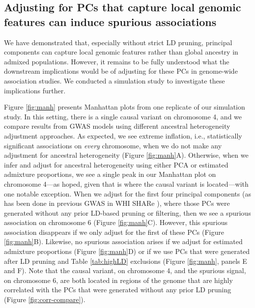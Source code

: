 \documentclass[12pt]{article}
\begin{document}
\subsection{Adjusting for PCs that capture local genomic features can induce spurious associations}

We have demonstrated that, especially without strict LD pruning, principal components can capture local genomic features rather than global ancestry in admixed populations.
However, it remains to be fully understood what the downstream implications would be of adjusting for these PCs in genome-wide association studies. 
We conducted a simulation study to investigate these implications further.

Figure \ref{fig:manh} presents Manhattan plots from one replicate of our simulation study.
In this setting, there is a single causal variant on chromosome 4, and we compare results from GWAS models using different ancestral heterogeneity adjustment approaches.
As expected, we see extreme inflation, i.e., statistically significant associations on \textit{every} chromosome, when we do not make any adjustment for ancestral heterogeneity (Figure \ref{fig:manh}A).
Otherwise, when we infer and adjust for ancestral heterogeneity using either PCA or estimated admixture proportions, we see a single peak in our Manhattan plot on chromosome 4---as hoped, given that is where the causal variant is located---with one notable exception.
When we adjust for the first four principal components (as has been done in previous GWAS in WHI SHARe \citep{reiner2012, carty2012}), where those PCs were generated without any prior LD-based pruning or filtering, then we see a spurious association on chromosome 6 (Figure \ref{fig:manh}C).
However, this spurious association disappears if we only adjust for the first of these PCs (Figure \ref{fig:manh}B).
Likewise, no spurious association arises if we adjust for estimated admixture proportions (Figure \ref{fig:manh}D) or if we use PCs that were generated after LD pruning and Table \ref{tab:highLD} exclusions (Figure \ref{fig:manh}, panels E and F).
Note that the causal variant, on chromosome 4, and the spurious signal, on chromosome 6, are both located in regions of the genome that are highly correlated with the PCs that were generated without any prior LD pruning (Figure \ref{fig:corr-compare}).
\end{document}
